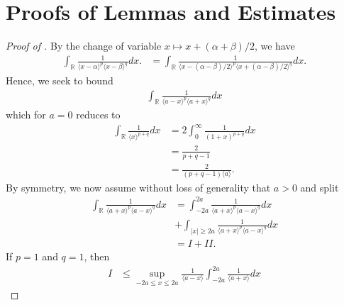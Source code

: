 \documentclass[12pt,reqno]{amsart}
\numberwithin{equation}{section}  %
\renewcommand{\cref}{\Cref}
\newcommand{\rr}{\mathbb{R}}
\begin{document}
\section{Proofs of Lemmas and Estimates} 
\label{sec:pfs-lems-est}
%
%
%
\begin{proof}[Proof of \cref{lem:calc}]
%
By the change of variable $x \mapsto x + (\alpha + \beta)/2$, we have
%
%
\begin{equation*}
	\begin{split}
    \int_{\rr} \frac{1}{\langle x - \alpha \rangle^{p} \langle  x -
    \beta
    \rangle^{q}}d x.
    & = \int_{\rr} \frac{1}{\langle x - (\alpha - \beta)/2  \rangle^{p}
    \langle  x + (\alpha - \beta)/2 \rangle^{q}} d x.
	\end{split}
\end{equation*}
%
%
Hence, we seek to bound
%
%
%
\begin{equation*}
\begin{split}
  \int_{\rr} \frac{1}{\langle a - x \rangle ^{p} \langle a + x \rangle
  ^{q}} d x
\end{split}
\end{equation*}
%
which for $a =0$ reduces to 
%
%
\begin{equation*}
\begin{split}
  \int_{\rr} \frac{1}{\langle x \rangle ^{p+q}} d x 
  & = 2 \int_{0}^{\infty} \frac{1}{(1 + x)^{p+q}} d x
  \\
  & = \frac{2}{p+q -1}
  \\
  & = \frac{2}{(p+q -1)\langle a \rangle}.
\end{split}
\end{equation*}
%
%
By symmetry, we now assume without loss of generality that $a > 0$ and split 
%
%
\begin{equation*}
\begin{split}
\int_{\rr} \frac{1}{\langle a + x \rangle ^{p} \langle a - x \rangle
  ^{q}} d x
  & = \int_{-2a}^{2a}
  \frac{1}{\langle a + x \rangle ^{p} \langle a - x \rangle
  ^{q}} d x
  \\
  & + \int_{| x | \ge 2a} 
\frac{1}{\langle a + x \rangle ^{p} \langle a - x \rangle
  ^{q}} d x
  \\
  & = I + II.
\end{split}
\end{equation*}
%
%
If $p=1$ and $q=1$, then 
%
%
\begin{equation*}
\begin{split}
  I
  & \le \sup_{-2a \le x \le 2a} \frac{1}{\langle a - x \rangle
} \int_{-2a}^{2a} \frac{1}{\langle a + x \rangle} d x

\end{split}
\end{equation*}
\end{proof}
\end{document}
